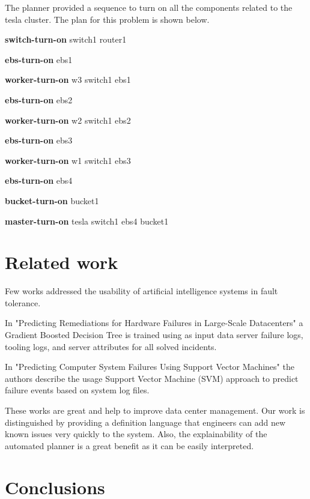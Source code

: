 \documentclass[letterpaper]{article}
\begin{document}
The planner provided a sequence to turn on all the components related to the tesla cluster. The plan for this problem is shown below.

\textbf{switch-turn-on} switch1 router1

\textbf{ebs-turn-on} ebs1

\textbf{worker-turn-on} w3 switch1 ebs1

\textbf{ebs-turn-on} ebs2

\textbf{worker-turn-on} w2 switch1 ebs2

\textbf{ebs-turn-on} ebs3

\textbf{worker-turn-on} w1 switch1 ebs3

\textbf{ebs-turn-on} ebs4

\textbf{bucket-turn-on} bucket1

\textbf{master-turn-on} tesla switch1 ebs4 bucket1


\section{Related work}\label{sec:related-work}

Few works addressed the usability of artificial intelligence systems in fault tolerance.

In "Predicting Remediations for Hardware Failures in Large-Scale Datacenters" \cite{lin2020predicting} a Gradient Boosted Decision Tree is trained using as input data server failure logs, tooling logs, and server attributes for all solved incidents.

In "Predicting Computer System Failures Using Support Vector Machines" \cite{10.5555/1855886.1855891} the authors describe the usage Support Vector Machine (SVM) approach to predict failure events based on system log files.

These works are great and help to improve data center management. Our work is distinguished by providing a definition language that engineers can add new known issues very quickly to the system. Also, the explainability of the automated planner is a great benefit as it can be easily interpreted.

\section{Conclusions}\label{sec:conclusions}
\end{document}
